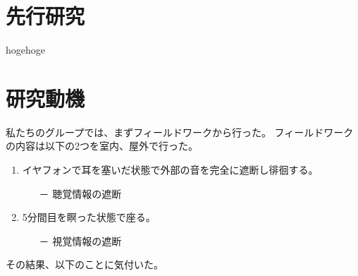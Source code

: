 \documentclass[12pt,a4paper]{report}
\begin{document}
\section{先行研究}
\noindent\space 
hogehoge
\section{研究動機}
\noindent\space
私たちのグループでは、まずフィールドワークから行った。
フィールドワークの内容は以下の2つを室内、屋外で行った。
\begin{enumerate}
  \item イヤフォンで耳を塞いだ状態で外部の音を完全に遮断し徘徊する。
  \begin{itemize}\item[－] 聴覚情報の遮断\end{itemize}
  \item 5分間目を瞑った状態で座る。
  \begin{itemize}\item[－] 視覚情報の遮断\end{itemize}
\end{enumerate}
その結果、以下のことに気付いた。
\end{document}
